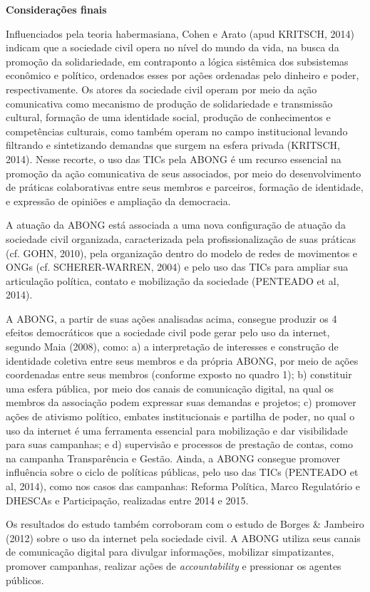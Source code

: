 \textbf{Considerações finais}

Influenciados pela teoria habermasiana, Cohen e Arato (apud KRITSCH,
2014) indicam que a sociedade civil opera no nível do mundo da vida, na
busca da promoção da solidariedade, em contraponto a lógica sistêmica
dos subsistemas econômico e político, ordenados esses por ações
ordenadas pelo dinheiro e poder, respectivamente. Os atores da sociedade
civil operam por meio da ação comunicativa como mecanismo de produção de
solidariedade e transmissão cultural, formação de uma identidade social,
produção de conhecimentos e competências culturais, como também operam
no campo institucional levando filtrando e sintetizando demandas que
surgem na esfera privada (KRITSCH, 2014). Nesse recorte, o uso das TICs
pela ABONG é um recurso essencial na promoção da ação comunicativa de
seus associados, por meio do desenvolvimento de práticas colaborativas
entre seus membros e parceiros, formação de identidade, e expressão de
opiniões e ampliação da democracia.

A atuação da ABONG está associada a uma nova configuração de atuação da
sociedade civil organizada, caracterizada pela profissionalização de
suas práticas (cf. GOHN, 2010), pela organização dentro do modelo de
redes de movimentos e ONGs (cf. SCHERER-WARREN, 2004) e pelo uso das
TICs para ampliar sua articulação política, contato e mobilização da
sociedade (PENTEADO et al, 2014).

A ABONG, a partir de suas ações analisadas acima, consegue produzir os 4
efeitos democráticos que a sociedade civil pode gerar pelo uso da
internet, segundo Maia (2008), como: a) a interpretação de interesses e
construção de identidade coletiva entre seus membros e da própria ABONG,
por meio de ações coordenadas entre seus membros (conforme exposto no
quadro 1); b) constituir uma esfera pública, por meio dos canais de
comunicação digital, na qual os membros da associação podem expressar
suas demandas e projetos; c) promover ações de ativismo político,
embates institucionais e partilha de poder, no qual o uso da internet é
uma ferramenta essencial para mobilização e dar visibilidade para suas
campanhas; e d) supervisão e processos de prestação de contas, como na
campanha Transparência e Gestão. Ainda, a ABONG consegue promover
influência sobre o ciclo de políticas públicas, pelo uso das TICs
(PENTEADO et al, 2014), como nos casos das campanhas: Reforma Política,
Marco Regulatório e DHESCAs e Participação, realizadas entre 2014 e
2015.

Os resultados do estudo também corroboram com o estudo de Borges \&
Jambeiro (2012) sobre o uso da internet pela sociedade civil. A ABONG
utiliza seus canais de comunicação digital para divulgar informações,
mobilizar simpatizantes, promover campanhas, realizar ações de
\emph{accountability} e pressionar os agentes públicos.

